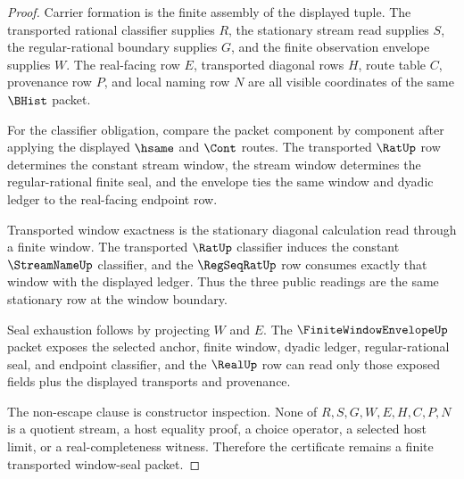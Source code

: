 \begin{proof}
Carrier formation is the finite assembly of the displayed tuple. The transported rational classifier supplies $R$, the stationary stream read supplies $S$, the regular-rational boundary supplies $G$, and the finite observation envelope supplies $W$. The real-facing row $E$, transported diagonal rows $H$, route table $C$, provenance row $P$, and local naming row $N$ are all visible coordinates of the same $\BHist$ packet.

For the classifier obligation, compare the packet component by component after applying the displayed $\hsame$ and $\Cont$ routes. The transported $\RatUp$ row determines the constant stream window, the stream window determines the regular-rational finite seal, and the envelope ties the same window and dyadic ledger to the real-facing endpoint row.

Transported window exactness is the stationary diagonal calculation read through a finite window. The transported $\RatUp$ classifier induces the constant $\StreamNameUp$ classifier, and the $\RegSeqRatUp$ row consumes exactly that window with the displayed ledger. Thus the three public readings are the same stationary row at the window boundary.

Seal exhaustion follows by projecting $W$ and $E$. The $\FiniteWindowEnvelopeUp$ packet exposes the selected anchor, finite window, dyadic ledger, regular-rational seal, and endpoint classifier, and the $\RealUp$ row can read only those exposed fields plus the displayed transports and provenance.

The non-escape clause is constructor inspection. None of $R,S,G,W,E,H,C,P,N$ is a quotient stream, a host equality proof, a choice operator, a selected host limit, or a real-completeness witness. Therefore the certificate remains a finite transported window-seal packet.
\end{proof}

